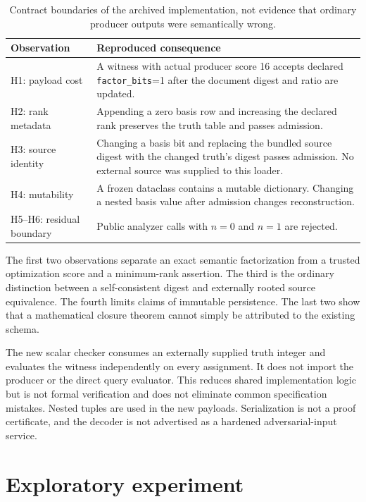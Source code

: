 \documentclass[11pt]{article}
\theoremstyle{definition}\newtheorem{definition}[theorem]{Definition}
\theoremstyle{remark}\newtheorem{remark}[theorem]{Remark}
\begin{document}
\begin{table}[ht]
\centering\small
\begin{tabularx}{\linewidth}{@{}lX@{}}\toprule
Observation & Reproduced consequence\\\midrule
H1: payload cost & A witness with actual producer score 16 accepts declared \texttt{factor\_bits}=1 after the document digest and ratio are updated.\\
H2: rank metadata & Appending a zero basis row and increasing the declared rank preserves the truth table and passes admission.\\
H3: source identity & Changing a basis bit and replacing the bundled source digest with the changed truth's digest passes admission. No external source was supplied to this loader.\\
H4: mutability & A frozen dataclass contains a mutable dictionary. Changing a nested basis value after admission changes reconstruction.\\
H5--H6: residual boundary & Public analyzer calls with $n=0$ and $n=1$ are rejected.\\\bottomrule
\end{tabularx}
\caption{Contract boundaries of the archived implementation, not evidence that ordinary producer outputs were semantically wrong.}\label{tab:audit}
\end{table}

The first two observations separate an exact semantic factorization from a trusted optimization score and a minimum-rank assertion. The third is the ordinary distinction between a self-consistent digest and externally rooted source equivalence. The fourth limits claims of immutable persistence. The last two show that a mathematical closure theorem cannot simply be attributed to the existing schema.

The new scalar checker consumes an externally supplied truth integer and evaluates the witness independently on every assignment. It does not import the producer or the direct query evaluator. This reduces shared implementation logic but is not formal verification and does not eliminate common specification mistakes. Nested tuples are used in the new payloads. Serialization is not a proof certificate, and the decoder is not advertised as a hardened adversarial-input service.

\section{Exploratory experiment}
\label{sec:experiment}
\end{document}
